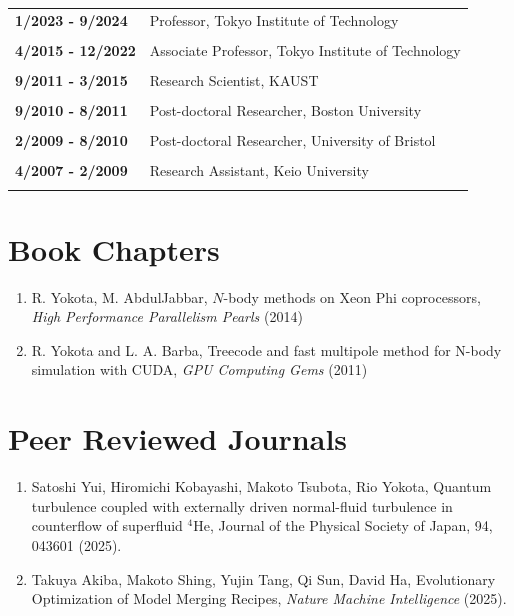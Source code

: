 \documentclass[margin,line]{cv}
\begin{document}
\begin{resume}
\begin{tabular}{ll}
{\bf 1/2023 - 9/2024} & Professor, Tokyo Institute of Technology\\ \\

{\bf 4/2015 - 12/2022} & Associate Professor, Tokyo Institute of Technology\\ \\

{\bf 9/2011 - 3/2015}& Research Scientist, KAUST\\ \\

{\bf 9/2010 - 8/2011}& Post-doctoral Researcher, Boston University\\ \\

{\bf 2/2009 - 8/2010}& Post-doctoral Researcher, University of Bristol\\ \\

{\bf 4/2007 - 2/2009}& Research Assistant, Keio University\\ \\
\end{tabular}

\section{\sc Book Chapters}
\begin{enumerate}
\item R. Yokota, M. AbdulJabbar,
$N$-body methods on Xeon Phi coprocessors,
{\it High Performance Parallelism Pearls} (2014)

\item R. Yokota and L. A. Barba,
Treecode and fast multipole method for N-body simulation with CUDA,
{\it GPU Computing Gems} (2011)
\end{enumerate}

\section{\sc Peer Reviewed Journals}
\begin{enumerate}
\item Satoshi Yui, Hiromichi Kobayashi, Makoto Tsubota, Rio Yokota, Quantum turbulence coupled with externally driven normal-fluid turbulence in counterflow of superfluid $^4$He, Journal of the Physical Society of Japan, 94, 043601 (2025).

\item Takuya Akiba, Makoto Shing, Yujin Tang, Qi Sun, David Ha, Evolutionary Optimization of Model Merging Recipes, {\it Nature Machine Intelligence} (2025).


\end{enumerate}
\end{resume}
\end{document}
